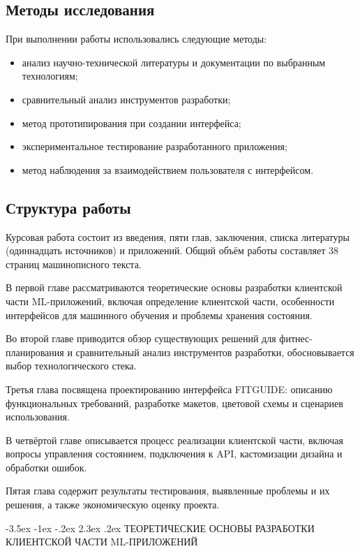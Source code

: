 \documentclass[14pt, a4paper]{extarticle}
\makeatletter
\renewcommand\section{\@startsection {section}{1}{\z@}%
{-3.5ex \@plus -1ex \@minus -.2ex}%
{2.3ex \@plus.2ex}%
{\centering\normalfont\Large\bfseries}}
\makeatother
\begin{document}
\begin{enumerate}
\subsection*{Методы исследования}

\noindent При выполнении работы использовались следующие методы:
\begin{itemize}
\item анализ научно-технической литературы и документации по выбранным технологиям;
\item сравнительный анализ инструментов разработки;
\item метод прототипирования при создании интерфейса;
\item экспериментальное тестирование разработанного приложения;
\item метод наблюдения за взаимодействием пользователя с интерфейсом.
\end{itemize}
\vskip 5cm
\subsection*{Структура работы}

\noindent Курсовая работа состоит из введения, пяти глав, заключения, списка литературы (одиннадцать источников) и приложений. Общий объём работы составляет 38 страниц машинописного текста.

\medskip
\noindent В первой главе рассматриваются теоретические основы разработки клиентской части ML-приложений, включая определение клиентской части, особенности интерфейсов для машинного обучения и проблемы хранения состояния.

\medskip
\noindent Во второй главе приводится обзор существующих решений для фитнес-планирования и сравнительный анализ инструментов разработки, обосновывается выбор технологического стека.

\medskip
\noindent Третья глава посвящена проектированию интерфейса FITGUIDE: описанию функциональных требований, разработке макетов, цветовой схемы и сценариев использования.

\medskip
\noindent В четвёртой главе описывается процесс реализации клиентской части, включая вопросы управления состоянием, подключения к API, кастомизации дизайна и обработки ошибок.

\medskip
\noindent Пятая глава содержит результаты тестирования, выявленные проблемы и их решения, а также экономическую оценку проекта.

\newpage
\section{ТЕОРЕТИЧЕСКИЕ ОСНОВЫ РАЗРАБОТКИ КЛИЕНТСКОЙ ЧАСТИ ML-ПРИЛОЖЕНИЙ}


\end{enumerate}
\end{document}
